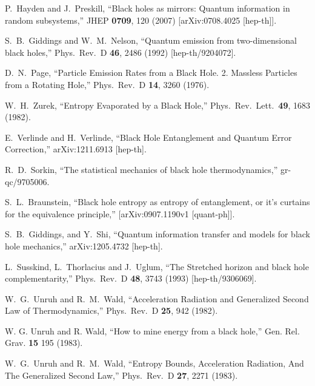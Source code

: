 \documentclass[12pt]{article}
\begin{document}
{\begin{thebibliography}{99}
  P.~Hayden and J.~Preskill,
  ``Black holes as mirrors: Quantum information in random subsystems,''
  JHEP {\bf 0709}, 120 (2007)
  [arXiv:0708.4025 [hep-th]].


  S.~B.~Giddings and W.~M.~Nelson,
  ``Quantum emission from two-dimensional black holes,''
  Phys.\ Rev.\ D {\bf 46}, 2486 (1992)
  [hep-th/9204072].


  D.~N.~Page,
  ``Particle Emission Rates from a Black Hole. 2. Massless Particles from a Rotating Hole,''
  Phys.\ Rev.\ D {\bf 14}, 3260 (1976).

  W.~H.~Zurek,
  ``Entropy Evaporated by a Black Hole,''
  Phys.\ Rev.\ Lett.\  {\bf 49}, 1683 (1982).

  E.~Verlinde and H.~Verlinde,
  ``Black Hole Entanglement and Quantum Error Correction,''
  arXiv:1211.6913 [hep-th].


  R.~D.~Sorkin,
  ``The statistical mechanics of black hole thermodynamics,''
  gr-qc/9705006.

  S.~L.~Braunstein, ``Black hole entropy as entropy of entanglement, or it's curtains for the equivalence principle,''
  [arXiv:0907.1190v1 [quant-ph]].


  S.~B.~Giddings, and Y.~Shi,
  ``Quantum information transfer and models for black hole mechanics,''
  arXiv:1205.4732 [hep-th].


  L.~Susskind, L.~Thorlacius and J.~Uglum,
  ``The Stretched horizon and black hole complementarity,''
  Phys.\ Rev.\ D {\bf 48}, 3743 (1993)
  [hep-th/9306069].

  W.~G.~Unruh and R.~M.~Wald,
  ``Acceleration Radiation and Generalized Second Law of Thermodynamics,''
  Phys.\ Rev.\ D {\bf 25}, 942 (1982).

W. G. Unruh and R. Wald,
``How to mine energy from a black hole,''
Gen. Rel. Grav. {\bf 15} 195 (1983).

  W.~G.~Unruh and R.~M.~Wald,
  ``Entropy Bounds, Acceleration Radiation, And The Generalized Second Law,''
  Phys.\ Rev.\ D {\bf 27}, 2271 (1983).


\end{thebibliography}}
\end{document}
